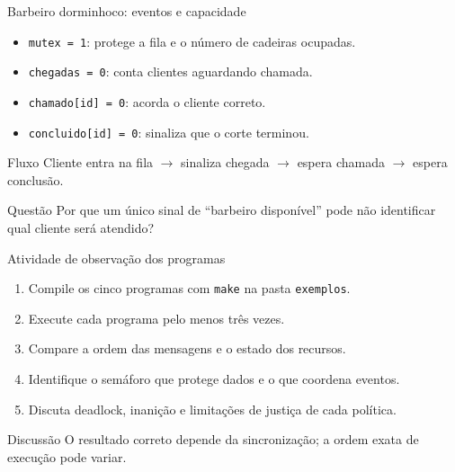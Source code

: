 \documentclass[aspectratio=169,11pt]{beamer}
\begin{document}
\begin{frame}{Barbeiro dorminhoco: eventos e capacidade}
\small
\begin{itemize}
\item \texttt{mutex = 1}: protege a fila e o número de cadeiras ocupadas.
\item \texttt{chegadas = 0}: conta clientes aguardando chamada.
\item \texttt{chamado[id] = 0}: acorda o cliente correto.
\item \texttt{concluido[id] = 0}: sinaliza que o corte terminou.
\end{itemize}
\vspace{0.2cm}
\begin{block}{Fluxo}
Cliente entra na fila $\rightarrow$ sinaliza chegada $\rightarrow$ espera chamada $\rightarrow$ espera conclusão.
\end{block}
\begin{alertblock}{Questão}
Por que um único sinal de ``barbeiro disponível'' pode não identificar qual cliente será atendido?
\end{alertblock}
\end{frame}

\begin{frame}{Atividade de observação dos programas}
\small
\begin{enumerate}
\setlength\itemsep{0.23cm}
\item Compile os cinco programas com \texttt{make} na pasta \texttt{exemplos}.
\item Execute cada programa pelo menos três vezes.
\item Compare a ordem das mensagens e o estado dos recursos.
\item Identifique o semáforo que protege dados e o que coordena eventos.
\item Discuta deadlock, inanição e limitações de justiça de cada política.
\end{enumerate}
\begin{block}{Discussão}
O resultado correto depende da sincronização; a ordem exata de execução pode variar.
\end{block}
\end{frame}
\end{document}
